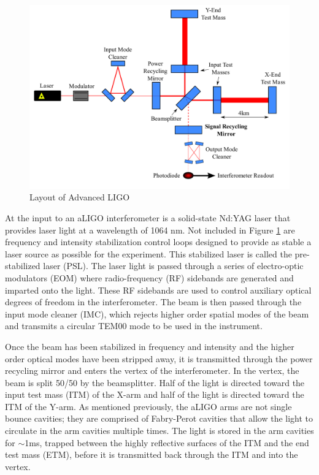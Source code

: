 \begin{figure}[ht!]
\includegraphics[width=\textwidth]{figures/introduction/ALIGO_layout}
\caption[Layout of Advanced LIGO]{Layout of Advanced LIGO}
\label{fig:aligo}
\end{figure}

At the input to an aLIGO interferometer is a solid-state Nd:YAG laser that provides laser light 
at a wavelength of 1064 nm. Not included in Figure \ref{fig:aligo} are frequency and 
intensity stabilization control loops designed to provide as stable a laser source as 
possible for the experiment. This stabilized laser is called the pre-stabilized laser 
(PSL). The laser light is passed through a series of 
electro-optic modulators (EOM) where radio-frequency (RF) sidebands are generated 
and imparted onto the light. These RF sidebands are used to control auxiliary optical 
degrees of freedom in the interferometer. The beam is then passed through the 
input mode cleaner (IMC), which rejects higher order spatial modes of the beam 
and transmits a circular TEM00 mode to be used in the instrument.

Once the beam has been stabilized in frequency and intensity and the higher order 
optical modes have been stripped away, it is transmitted through the power 
recycling mirror and enters the vertex of the interferometer. In the vertex, 
the beam is split 50/50 by the beamsplitter. Half of the light is directed toward  
the input test mass (ITM) of the X-arm and half of the light is directed  
toward the ITM of the Y-arm. As mentioned previously, the aLIGO arms are not 
single bounce cavities; they are comprised of Fabry-Perot cavities that allow the 
light to circulate in the arm cavities multiple times. The light is stored in 
the arm cavities for $\sim$1ms, trapped between the highly reflective surfaces 
of the ITM and the end test mass (ETM), before it is transmitted back through 
the ITM and into the vertex.

